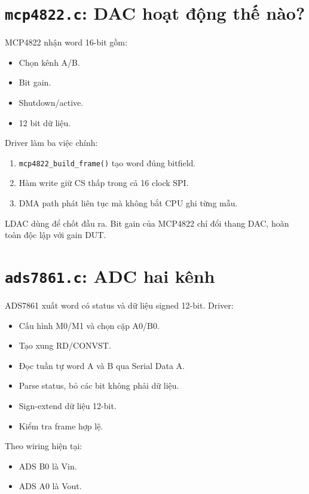 \documentclass[12pt,a4paper,oneside]{article}
\newcommand{\inlinecode}[1]{\texttt{#1}}
\begin{document}
\section{\inlinecode{mcp4822.c}: DAC hoạt động thế nào?}

MCP4822 nhận word 16-bit gồm:

\begin{itemize}
\item Chọn kênh A/B.
\item Bit gain.
\item Shutdown/active.
\item 12 bit dữ liệu.
\end{itemize}

Driver làm ba việc chính:

\begin{enumerate}
\item \inlinecode{mcp4822\_build\_frame()} tạo word đúng bitfield.
\item Hàm write giữ CS thấp trong cả 16 clock SPI.
\item DMA path phát liên tục mà không bắt CPU ghi từng mẫu.
\end{enumerate}

LDAC dùng để chốt đầu ra. Bit gain của MCP4822 chỉ đổi thang DAC, hoàn toàn độc lập với gain DUT.

\section{\inlinecode{ads7861.c}: ADC hai kênh}

ADS7861 xuất word có status và dữ liệu signed 12-bit. Driver:

\begin{itemize}
\item Cấu hình M0/M1 và chọn cặp A0/B0.
\item Tạo xung RD/CONVST.
\item Đọc tuần tự word A và B qua Serial Data A.
\item Parse status, bỏ các bit không phải dữ liệu.
\item Sign-extend dữ liệu 12-bit.
\item Kiểm tra frame hợp lệ.
\end{itemize}

Theo wiring hiện tại:

\begin{itemize}
\item ADS B0 là Vin.
\item ADS A0 là Vout.
\end{itemize}
\end{document}
